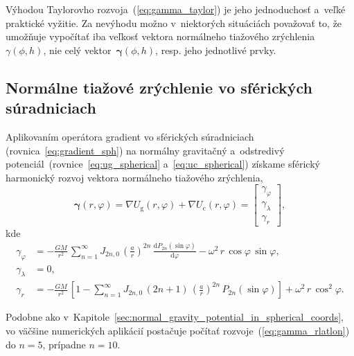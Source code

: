\documentclass[a4paper, 12pt]{book}
\newcommand{\diff}{\mathrm d}
\newcommand{\gidx}{\mathrm g}
\newcommand{\cidx}{\mathrm c}
\begin{document}
Výhodou Taylorovho rozvoja~(\ref{eq:gamma_taylor}) je jeho jednoduchosť a~veľké 
praktické vyžitie.  Za nevýhodu možno v~niektorých situáciách považovať to, že 
umožňuje vypočítať iba veľkosť vektora normálneho tiažového zrýchlenia 
$\gamma(\phi, h)$, nie celý vektor~$\boldsymbol \gamma(\phi, h)$, resp. jeho 
jednotlivé prvky.







\subsection{Normálne tiažové zrýchlenie vo sférických súradniciach}
\label{sec:normal_gravity_in_sph_coords}

Aplikovaním operátora gradient vo sférických súradniciach 
(rovnica~\ref{eq:gradient_sph}) na normálny gravitačný a~odstredivý 
potenciál~(rovnice~\ref{eq:ug_spherical} a~\ref{eq:uc_spherical}) získame 
sférický harmonický rozvoj vektora normálneho tiažového zrýchlenia,
%
\begin{equation}
\boldsymbol \gamma(r, \varphi) = \nabla U_\gidx(r, \varphi) + \nabla U_\cidx(r, 
\varphi) =
%
\begin{bmatrix}
\gamma_\varphi\\
\gamma_\lambda\\
\gamma_r
\end{bmatrix}
%
{,}
\end{equation}
%
kde
%
\begin{equation}
\label{eq:gamma_rlatlon}
\begin{split}
\gamma_\varphi &= -\frac{GM}{r^2} \, \sum_{n = 1}^\infty J_{2n,0} \, \left( 
\frac{a}{r} \right)^{2n} \, \frac{\diff P_{2n}(\sin\varphi)}{\diff \varphi} 
-\omega^2 \, r \, \cos\varphi \, \sin\varphi{,}\\
\gamma_\lambda &= 0{,}\\
\gamma_r &= -\frac{GM}{r^2} \, \left[ 1 - \sum_{n = 1}^{\infty} J_{2n,0} \, (2n 
+ 1) \, \left( \frac{a}{r} \right)^{2n} \, P_{2n}(\sin\varphi) \right] 
+ \omega^2 \, r \, \cos^2\varphi{.}
\end{split}
\end{equation}

Podobne ako v~Kapitole~\ref{sec:normal_gravity_potential_in_spherical_coords}, 
vo väčšine numerických aplikácií postačuje počítať 
rozvoje~(\ref{eq:gamma_rlatlon}) do $n = 5$, prípadne $n = 10$.
\end{document}
